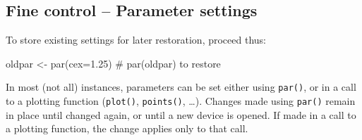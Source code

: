 \documentclass{tufte-book}\usepackage[]{graphicx}\usepackage[]{color}
\newcommand{\txtt}[1]{\texttt{#1}}
\begin{document}
\subsection{Fine control -- Parameter settings}\label{ss:fine}
\begin{marginfigure}[24pt]
  To store existing settings for later restoration, proceed thus:
\begin{Schunk}
\begin{Sinput}
oldpar <- par(cex=1.25)
  # par(oldpar) to restore
\end{Sinput}
\end{Schunk}
\end{marginfigure}
In most (not all) instances, parameters can be set either using
\txtt{par()}, or in a call to a plotting function (\txtt{plot()},
\txtt{points()}, \ldots).  Changes made using \txtt{par()} remain in
place until changed again, or until a new device is opened.  If made
in a call to a plotting function, the change applies only to that
call.
\end{document}
